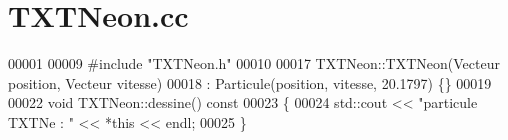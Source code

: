 \section{T\+X\+T\+Neon.\+cc}
\label{_t_x_t_neon_8cc_source}

\begin{DoxyCode}
00001 
00009 \textcolor{preprocessor}{#include "TXTNeon.h"}
00010 
00017 TXTNeon::TXTNeon(Vecteur position, Vecteur vitesse)
00018  : Particule(position, vitesse, 20.1797) \{\}
00019 
00022 \textcolor{keywordtype}{void} TXTNeon::dessine()\textcolor{keyword}{ const}
00023 \textcolor{keyword}{}\{
00024     std::cout << \textcolor{stringliteral}{"particule TXTNe : "} << *\textcolor{keyword}{this} << endl;
00025 \}
\end{DoxyCode}

